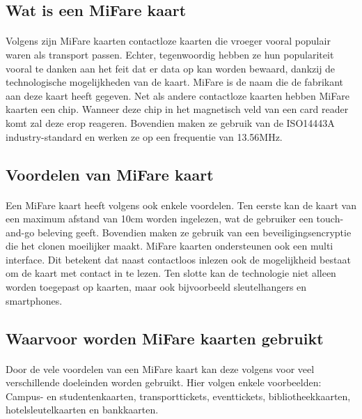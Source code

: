 \bigskip
\subsection{Wat is een MiFare kaart}
\paragraph{}
Volgens \textcite{Digitalid} zijn MiFare kaarten contactloze kaarten die vroeger vooral populair waren als transport passen. Echter, tegenwoordig hebben ze hun populariteit vooral te danken aan het feit dat er data op kan worden bewaard, dankzij de technologische mogelijkheden van de kaart. MiFare is de naam die de fabrikant aan deze kaart heeft gegeven. 
Net als andere contactloze kaarten hebben MiFare kaarten een chip. Wanneer deze chip in het magnetisch veld van een card reader komt zal deze erop reageren. Bovendien maken ze gebruik van de ISO14443A industry-standard en werken ze op een frequentie van 13.56MHz.

\bigskip
\subsection{Voordelen van MiFare kaart}
\paragraph{}
Een MiFare kaart heeft volgens \textcite{Printplast} ook enkele voordelen. Ten eerste kan de kaart van een maximum afstand van 10cm worden ingelezen, wat de gebruiker een touch-and-go beleving geeft.
Bovendien maken ze gebruik van een beveiligingsencryptie die het clonen moeilijker maakt. MiFare kaarten ondersteunen ook een multi interface. Dit betekent dat naast contactloos inlezen ook de mogelijkheid bestaat om de kaart met contact in te lezen. Ten slotte kan de technologie niet alleen worden toegepast op kaarten, maar ook bijvoorbeeld sleutelhangers en smartphones.

\bigskip
\subsection{Waarvoor worden MiFare kaarten gebruikt}
\paragraph{}
Door de vele voordelen van een MiFare kaart kan deze volgens \textcite{Digitalid} voor veel verschillende doeleinden worden gebruikt. Hier volgen enkele voorbeelden: Campus- en studentenkaarten, transporttickets, eventtickets, bibliotheekkaarten, hotelsleutelkaarten en bankkaarten.

